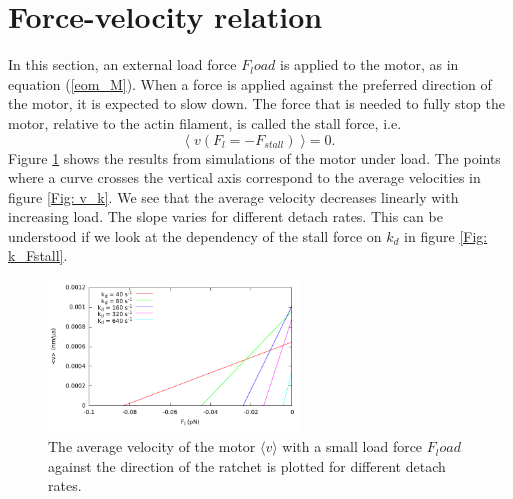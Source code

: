 \documentclass[aps,pre,onecolumn,showpacs,showkeys,a4paper]{revtex4}
\begin{document}
\section{Force-velocity relation}
In this section, an external load force $F_load$ is applied to the motor, as in equation (\ref{eom_M}). 
When a force is applied against the preferred direction of the motor, it is expected to slow down. 
The force that is needed to fully stop the motor, relative to the actin filament, is called the stall force, i.e. 
\[
\langle\; v ( F_{l} = -F_{stall} )\; \rangle = 0 .
\]
Figure \ref{Fig: F_v_zoom}  shows the results from simulations of the motor under load. 
The points where a curve crosses the vertical axis correspond to the average velocities in figure \ref{Fig: v_k}. 
We see that the average velocity decreases linearly with increasing load. 
The slope varies for different detach rates. This can be understood if we look at the dependency of the stall force on $k_{d}$ in figure \ref{Fig: k_Fstall}.
\begin{figure}[h]
\centering
\includegraphics[width=0.6\textwidth,height=!]{F_v_zoom}
\caption{The average velocity of the motor $\langle v \rangle$ with a small load force $F_load$ against the direction of the ratchet is plotted for different detach rates.}
\label{Fig: F_v_zoom} 
\end{figure}
\end{document}

